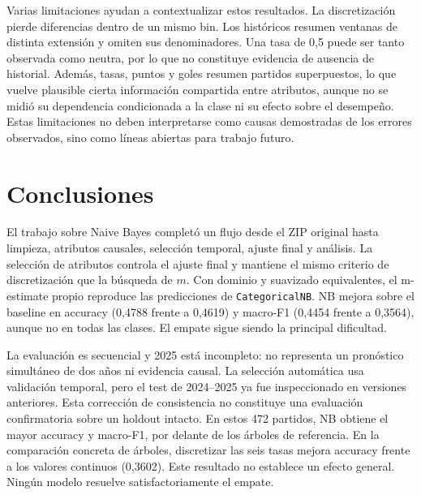 \documentclass[conference]{IEEEtran}
\begin{document}
Varias limitaciones ayudan a contextualizar estos resultados. La discretización pierde diferencias dentro de un mismo bin. Los históricos resumen ventanas de distinta extensión y omiten sus denominadores. Una tasa de 0,5 puede ser tanto observada como neutra, por lo que no constituye evidencia de ausencia de historial. Además, tasas, puntos y goles resumen partidos superpuestos, lo que vuelve plausible cierta información compartida entre atributos, aunque no se midió su dependencia condicionada a la clase ni su efecto sobre el desempeño. Estas limitaciones no deben interpretarse como causas demostradas de los errores observados, sino como líneas abiertas para trabajo futuro.

\section{Conclusiones}
El trabajo sobre Naive Bayes completó un flujo desde el ZIP original hasta limpieza, atributos causales, selección temporal, ajuste final y análisis. La selección de atributos controla el ajuste final y mantiene el mismo criterio de discretización que la búsqueda de $m$. Con dominio y suavizado equivalentes, el m-estimate propio reproduce las predicciones de \texttt{CategoricalNB}. NB mejora sobre el baseline en accuracy (0,4788 frente a 0,4619) y macro-F1 (0,4454 frente a 0,3564), aunque no en todas las clases. El empate sigue siendo la principal dificultad.

La evaluación es secuencial y 2025 está incompleto: no representa un pronóstico simultáneo de dos años ni evidencia causal. La selección automática usa validación temporal, pero el test de 2024--2025 ya fue inspeccionado en versiones anteriores. Esta corrección de consistencia no constituye una evaluación confirmatoria sobre un holdout intacto. En estos 472 partidos, NB obtiene el mayor accuracy y macro-F1, por delante de los árboles de referencia. En la comparación concreta de árboles, discretizar las seis tasas mejora accuracy frente a los valores continuos (0,3602). Este resultado no establece un efecto general. Ningún modelo resuelve satisfactoriamente el empate.
\end{document}
